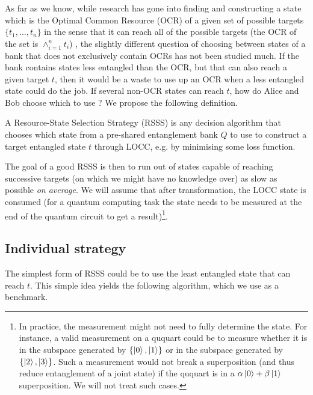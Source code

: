 As far as we know, while research has gone into finding and constructing a state which is the Optimal Common Resource (OCR) of a given set of possible targets $\{t_1, \dots, t_n\}$ in the sense that it can reach all of the possible targets (the OCR of the set is $\wedge_{i=1}^n t_i$) \cite{bosyk_optimal_2019, deside_probabilistic_2024}, the slightly different question of choosing between states of a bank that does not exclusively contain OCRs has not been studied much. If the bank contains states less entangled than the OCR, but that can also reach a given target $t$, then it would be a waste to use up an OCR when a less entangled state could do the job. If several non-OCR states can reach $t$, how do Alice and Bob choose which to use ? We propose the following definition.

\begin{definition}
    A Resource-State Selection Strategy (RSSS) is any decision algorithm that chooses which state from a pre-shared entanglement bank $Q$ to use to construct a target entangled state $t$ through LOCC, e.g. by minimising some loss function.
\end{definition}

The goal of a good RSSS is then to run out of states capable of reaching successive targets (on which we might have no knowledge over) as slow as possible \textit{on average}. We will assume that after transformation, the LOCC state is consumed (for a quantum computing task the state needs to be measured at the end of the quantum circuit to get a result)\footnote{In practice, the measurement might not need to fully determine the state. For instance, a valid measurement on a ququart could be to measure whether it is in the subspace generated by $\{\ket{0}, \ket{1}\}$ or in the subspace generated by $\{\ket{2}, \ket{3}\}$. Such a measurement would not break a superposition (and thus reduce entanglement of a joint state) if the ququart is in a $\alpha\ket{0} + \beta\ket{1}$ superposition. We will not treat such cases.}.



\subsection{Individual strategy}

The simplest form of RSSS could be to use the least entangled state that can reach $t$. This simple idea yields the following algorithm, which we use as a benchmark.


